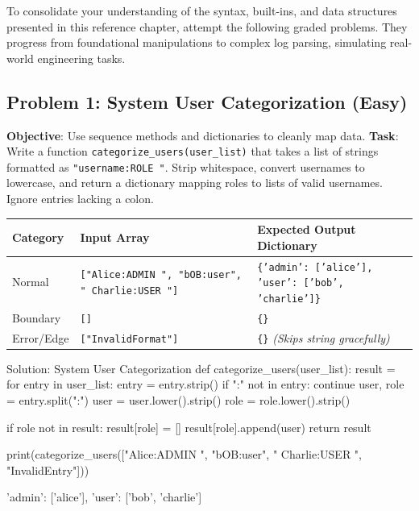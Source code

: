 \begin{practiceset}
To consolidate your understanding of the syntax, built-ins, and data structures presented in this reference chapter, attempt the following graded problems. They progress from foundational manipulations to complex log parsing, simulating real-world engineering tasks.
\end{practiceset}

\subsection*{Problem 1: System User Categorization (Easy)}
\textbf{Objective}: Use sequence methods and dictionaries to cleanly map data.
\textbf{Task}: Write a function \texttt{categorize\_users(user\_list)} that takes a list of strings formatted as \texttt{"username:ROLE "}. Strip whitespace, convert usernames to lowercase, and return a dictionary mapping roles to lists of valid usernames. Ignore entries lacking a colon.

\begin{table}[htbp]
\centering
\small
\begin{tabularx}{\linewidth}{lXl}
\toprule
\textbf{Category} & \textbf{Input Array} & \textbf{Expected Output Dictionary} \\
\midrule
Normal & \texttt{["Alice:ADMIN ", "bOB:user", " Charlie:USER "]} & \texttt{\{'admin': ['alice'], 'user': ['bob', 'charlie']\}} \\
Boundary & \texttt{[]} & \texttt{\{\}} \\
Error/Edge & \texttt{["InvalidFormat"]} & \texttt{\{\}} \textit{(Skips string gracefully)} \\
\bottomrule
\end{tabularx}
\end{table}

\begin{pythoncode}[]{Solution: System User Categorization}
def categorize_users(user_list):
    result = {}
    for entry in user_list:
        entry = entry.strip()
        if ":" not in entry:
            continue
        user, role = entry.split(":")
        user = user.lower().strip()
        role = role.lower().strip()
        
        if role not in result:
            result[role] = []
        result[role].append(user)
    return result

print(categorize_users(["Alice:ADMIN ", "bOB:user", " Charlie:USER ", "InvalidEntry"]))
\end{pythoncode}
\begin{outputbox}
 {'admin': ['alice'], 'user': ['bob', 'charlie']}
\end{outputbox}

